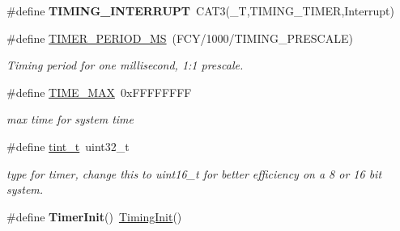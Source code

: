 \begin{DoxyCompactItemize}
\item 
\hypertarget{group__timing_gae606786fc810eb3e893b81685ed9175e}{\#define {\bfseries T\+I\+M\+I\+N\+G\+\_\+\+I\+N\+T\+E\+R\+R\+U\+P\+T}~C\+A\+T3(\+\_\+\+T,T\+I\+M\+I\+N\+G\+\_\+\+T\+I\+M\+E\+R,Interrupt)}\label{group__timing_gae606786fc810eb3e893b81685ed9175e}

\item 
\hypertarget{group__timing_gad6e9c4cab12b06864c5162252ca67014}{\#define \hyperlink{group__timing_gad6e9c4cab12b06864c5162252ca67014}{T\+I\+M\+E\+R\+\_\+\+P\+E\+R\+I\+O\+D\+\_\+\+M\+S}~(F\+C\+Y/1000/T\+I\+M\+I\+N\+G\+\_\+\+P\+R\+E\+S\+C\+A\+L\+E)}\label{group__timing_gad6e9c4cab12b06864c5162252ca67014}

\begin{DoxyCompactList}\small\item\em Timing period for one millisecond, 1\+:1 prescale. \end{DoxyCompactList}\item 
\hypertarget{group__timing_ga0540485394df82add6b7c4f2137c7f21}{\#define \hyperlink{group__timing_ga0540485394df82add6b7c4f2137c7f21}{T\+I\+M\+E\+\_\+\+M\+A\+X}~0x\+F\+F\+F\+F\+F\+F\+F\+F}\label{group__timing_ga0540485394df82add6b7c4f2137c7f21}

\begin{DoxyCompactList}\small\item\em max time for system time \end{DoxyCompactList}\item 
\hypertarget{group__timing_gaef97c9386393beb1be4ed0b1513ee481}{\#define \hyperlink{group__timing_gaef97c9386393beb1be4ed0b1513ee481}{tint\+\_\+t}~uint32\+\_\+t}\label{group__timing_gaef97c9386393beb1be4ed0b1513ee481}

\begin{DoxyCompactList}\small\item\em type for timer, change this to uint16\+\_\+t for better efficiency on a 8 or 16 bit system. \end{DoxyCompactList}\item 
\hypertarget{group__timing_ga51a3c365b49c844dad08a14204198b75}{\#define {\bfseries Timer\+Init}()~\hyperlink{group__timing_ga708280b92693de1cda94095470fbaad8}{Timing\+Init}()}\label{group__timing_ga51a3c365b49c844dad08a14204198b75}

\end{DoxyCompactItemize}
